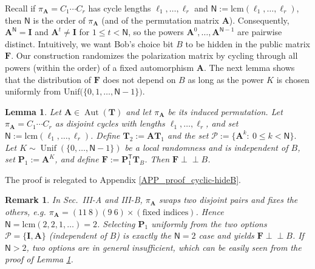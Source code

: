 \documentclass[onecolumn]{IEEEtran} %
\newcommand{\1}{\mathbbm{1}}
\DeclareMathOperator{\Aut}{Aut}
\theoremstyle{boldremark}
\newtheorem{remark}{Remark}
\newtheorem{lemma}{Lemma}
\DeclareMathOperator{\Unif}{Unif}
\newcommand{\pperp}{\mathrel{\perp\!\!\!\perp}}
\begin{document}
Recall if $\pi_{\mathbf A}=C_1\cdots C_r$ has cycle lengths $\ell_1,\dots,\ell_r$ and $  \textsf{N}:=\mathrm{lcm}(\ell_1,\dots,\ell_r)$, then $  \textsf{N}$ is the order of $\pi_{\mathbf A}$ (and of the permutation matrix $\mathbf A$). Consequently, $\mathbf A^{  \textsf{N}}=\mathbf I$ and $\mathbf A^{t}\ne \mathbf I$ for $1\le t<  \textsf{N}$, so the powers $\mathbf A^{0},\dots,\mathbf A^{  \textsf{N}-1}$ are pairwise distinct. Intuitively, we want Bob's choice bit \(B\) to be hidden in the public
matrix \(\mathbf F\). Our construction randomizes the polarization matrix by cycling
through all powers (within the order) of a fixed automorphism \(\mathbf A\).
The next lemma shows that the distribution of \(\mathbf F\) does not depend on \(B\) as long as the
power \(K\) is chosen uniformly from $\mathrm{Unif}\bigl(\{0,1,\dots,\textsf{N}-1\}\bigr)$.



\begin{lemma}\label{lem:cyclic-hideB}
Let \(\mathbf A\in\Aut(\mathbf T)\) and let \(\pi_{\mathbf A}\) be its induced
permutation. Let \(\pi_{\mathbf A}=C_1\cdots C_r\) as disjoint cycles with lengths
\(\ell_1,\dots,\ell_r\), and set \(  \textsf{N}:=\mathrm{lcm}(\ell_1,\dots,\ell_r)\).
Define \(\mathbf T_2:=\mathbf A\mathbf T_1\) and the set
$\mathcal P:=\{\mathbf A^{k}:\ 0\le k<  \textsf{N}\}.$
Let \(K\sim\Unif(\{0,\ldots,  \textsf{N}-1\})\) be a local randomness and is independent of \(B\), set \(\mathbf P_1:=\mathbf A^{K}\), and define
\(\mathbf F:=\mathbf P_1^{\mathsf T}\mathbf T_B\). Then \(\mathbf F\pperp B\).
\end{lemma}
The proof is relegated to Appendix \ref{APP_proof_cyclic-hideB}.


\begin{remark}\label{rem:cycle-period}
 In Sec.~III-A and III-B, $\pi_{\mathbf A}$ swaps two disjoint pairs and fixes the
  others, e.g. $\pi_{\mathbf A}=(11\ 8)(9\ 6)\times(\text{fixed indices})$. Hence $  \textsf{N}=\mathrm{lcm}(2,2,1,\ldots)=2$.
  Selecting $\mathbf P_1$ uniformly from the two options $\mathcal P=\{\mathbf I,\mathbf A\}$ (independent of $B$) is exactly the $  \textsf{N}=2$ case and yields $\mathbf F\pperp B$.
 If $  \textsf{N}>2$, two options are in general insufficient, which can be easily seen from the proof of Lemma \ref{lem:cyclic-hideB}. 
\end{remark}
\end{document}
